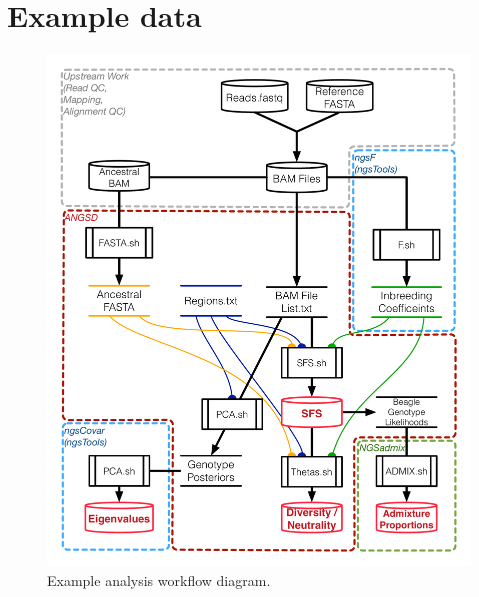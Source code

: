 \documentclass[10pt,a4paper]{article}
\begin{document}
\section*{Example data}
\begin{figure}
\centering
\includegraphics[width=\linewidth]{figures/MainTextWorkflow.pdf}
\caption{Example analysis workflow diagram.}
\label{fig:workflow}
\end{figure}
\end{document}
